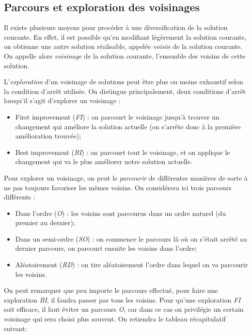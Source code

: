 \documentclass[a4paper,11pt]{article}%
\begin{document}
\subsection{Parcours et exploration des voisinages}
\label{voisinage}

Il existe plusieurs moyens pour procéder à une diversification de la solution courante.
En effet, il est possible qu'en modifiant légèrement la solution courante, on obtienne une autre solution réalisable, appelée \emph{voisin} de la solution courante.
On appelle alors \emph{voisinage} de la solution courante, l'ensemble des voisins de cette solution.

L'\emph{exploration} d'un voisinage de solutions peut être plus ou moins exhaustif selon la condition d'arrêt utilisée.
On distingue principalement, deux conditions d'arrêt lorsqu'il s'agit d'explorer un voisinage :

\begin{itemize}
\item First improvement (\emph{FI}) : on parcourt le voisinage jusqu'à trouver un changement qui améliore la solution actuelle (on s'arrête donc à la première amélioration trouvée);
\item Best improvement (\emph{BI}) : on parcourt tout le voisinage, et on applique le changement qui va le plus améliorer notre solution actuelle. 
\end{itemize}

Pour explorer un voisinage, on peut le \emph{parcourir} de différentes manières de sorte à ne pas toujours favoriser les mêmes voisins. On considérera ici trois parcours différents : 

\begin{itemize}
\item Dans l'ordre (\emph{O}) : les voisins sont parcourus dans un ordre naturel (du premier au dernier);
\item Dans un semi-ordre (\emph{SO}) : on commence le parcours là où on s'était arrêté au dernier parcours, on parcourt ensuite les voisins dans l'ordre;
\item Aléatoirement (\emph{RD}) : on tire aléatoirement l'ordre dans lequel on va parcourir les voisins. 
\end{itemize}

On peut remarquer que peu importe le parcours effectué, pour faire une exploration \emph{BI}, il faudra passer par tous les voisins. Pour qu'une exploration \emph{FI} soit efficace, il faut éviter un parcours \emph{O}, car dans ce cas on privilégie un certain voisinage qui sera choisi plus souvent. On retiendra le tableau récapitulatif suivant:
\end{document}
